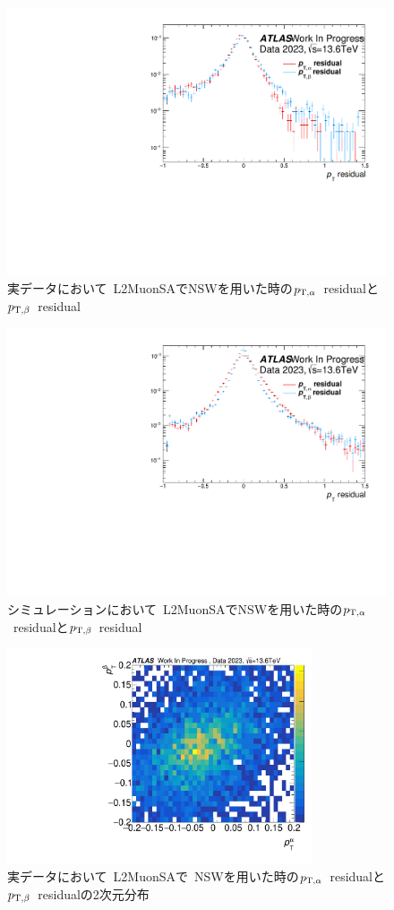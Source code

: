 \begin{figure}[h]
    \centering
    \includegraphics[clip, width=12cm]{fig/5/data_ptresidual_alpha_beta.pdf}
    \caption{実データにおいて~L2MuonSAでNSWを用いた時の$p_{\mathrm{T}, \alpha}$~residualと$p_{\mathrm{T}, \beta}$~residual}
    \label{fig:ptresidualAlphaBetaData}
\end{figure}

\begin{figure}[h]
    \centering
    \includegraphics[clip, width=12cm]{fig/5/MC_ptresidual_alpha_beta.pdf}
    \caption{シミュレーションにおいて~L2MuonSAでNSWを用いた時の$p_{\mathrm{T}, \alpha}$~residualと$p_{\mathrm{T}, \beta}$~residual}
    \label{fig:ptresidualAlphaBetaMC}
\end{figure}

\begin{figure}
    \centering
    \includegraphics[clip, width=9cm]{fig/5/ptresidual_alpha_beta_data.pdf}
    \caption{実データにおいて~L2MuonSAで~NSWを用いた時の$p_{\mathrm{T}, \alpha}$~residualと$p_{\mathrm{T}, \beta}$~residualの2次元分布}
    \label{fig:2DptresidualAlphaBetaData}
\end{figure}

